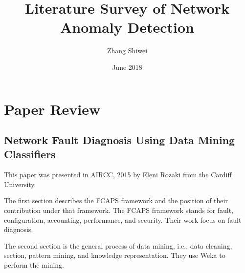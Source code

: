 \documentclass{manuscript}
\title{Literature Survey of Network Anomaly Detection}
\author{Zhang Shiwei}
\date{June 2018}
\begin{document}
    \maketitle

    \section{Paper Review}

    \subsection{Network Fault Diagnosis Using Data Mining Classifiers \cite{rozaki_network_2015}}

    This paper was presented in AIRCC, 2015 by Eleni Rozaki from the Cardiff University.

    The first section describes the FCAPS framework and the position of their contribution under that framework. The
    FCAPS framework stands for fault, configuration, accounting, performance, and security. Their work focus on fault
    diagnosis.

    The second section is the general process of data mining, i.e., data cleaning, section, pattern mining, and knowledge
    representation. They use Weka to perform the mining.
\end{document}
